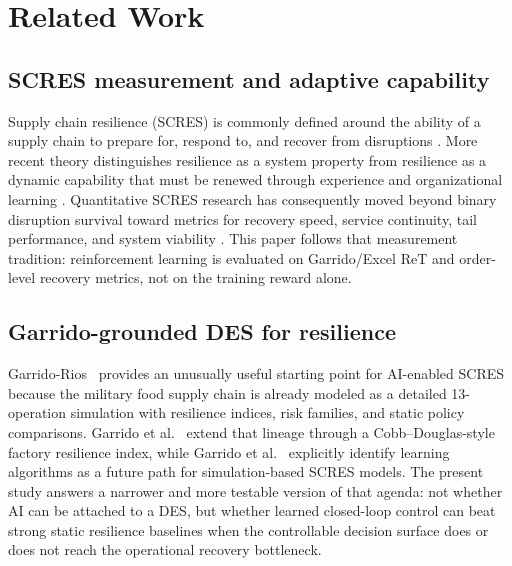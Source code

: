 \hypertarget{2-related-work}{%
\section{Related Work}\label{2-related-work}}

\hypertarget{21-scres-measurement-and-adaptive-capability}{%
\subsection{SCRES measurement and adaptive capability}\label{21-scres-measurement-and-adaptive-capability}}

Supply chain resilience (SCRES) is commonly defined around the ability of
a supply chain to prepare for, respond to, and recover from disruptions
\cite{ponomarov2009understanding}. More recent theory distinguishes
resilience as a system property from resilience as a dynamic capability
that must be renewed through experience and organizational learning
\cite{wieland2021two,levitt1988organizational}. Quantitative SCRES
research has consequently moved beyond binary disruption survival toward
metrics for recovery speed, service continuity, tail performance, and
system viability \cite{hosseini2019review}. This paper follows that
measurement tradition: reinforcement learning is evaluated on
Garrido/Excel ReT and order-level recovery metrics, not on the training
reward alone.

\hypertarget{22-garrido-grounded-des-for-resilience}{%
\subsection{Garrido-grounded DES for resilience}\label{22-garrido-grounded-des-for-resilience}}

Garrido-Rios~\cite{garrido2017} provides an unusually useful starting
point for AI-enabled SCRES because the military food supply chain is
already modeled as a detailed 13-operation simulation with resilience
indices, risk families, and static policy comparisons. Garrido et
al.~\cite{garrido2024ijpr} extend that lineage through a
Cobb--Douglas-style factory resilience index, while Garrido et
al.~\cite{garrido2024iccl} explicitly identify learning algorithms as a
future path for simulation-based SCRES models. The present study answers
a narrower and more testable version of that agenda: not whether AI can
be attached to a DES, but whether learned closed-loop control can beat
strong static resilience baselines when the controllable decision surface
does or does not reach the operational recovery bottleneck.

